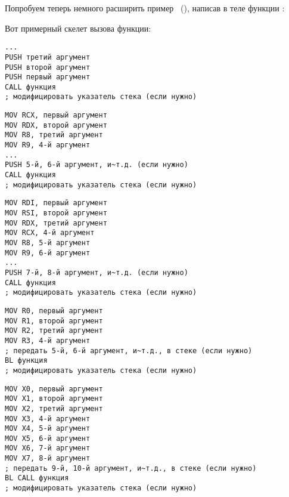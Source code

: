 \chapterold{\PrintfSeveralArgumentsSectionName}

Попробуем теперь немного расширить пример \IT{\HelloWorldSectionName}~(),
написав в теле функции \main:







\sectionold{\Conclusion{}}

Вот примерный скелет вызова функции:

\begin{lstlisting}[caption=x86]
...
PUSH третий аргумент
PUSH второй аргумент
PUSH первый аргумент
CALL функция
; модифицировать указатель стека (если нужно)
\end{lstlisting}

\begin{lstlisting}[caption=x64 (MSVC)]
MOV RCX, первый аргумент
MOV RDX, второй аргумент
MOV R8, третий аргумент
MOV R9, 4-й аргумент
...
PUSH 5-й, 6-й аргумент, и~т.д. (если нужно)
CALL функция
; модифицировать указатель стека (если нужно)
\end{lstlisting}

\begin{lstlisting}[caption=x64 (GCC)]
MOV RDI, первый аргумент
MOV RSI, второй аргумент
MOV RDX, третий аргумент
MOV RCX, 4-й аргумент
MOV R8, 5-й аргумент
MOV R9, 6-й аргумент
...
PUSH 7-й, 8-й аргумент, и~т.д. (если нужно)
CALL функция
; модифицировать указатель стека (если нужно)
\end{lstlisting}

\begin{lstlisting}[caption=ARM]
MOV R0, первый аргумент
MOV R1, второй аргумент
MOV R2, третий аргумент
MOV R3, 4-й аргумент
; передать 5-й, 6-й аргумент, и~т.д., в стеке (если нужно)
BL функция
; модифицировать указатель стека (если нужно)
\end{lstlisting}

\begin{lstlisting}[caption=ARM64]
MOV X0, первый аргумент
MOV X1, второй аргумент
MOV X2, третий аргумент
MOV X3, 4-й аргумент
MOV X4, 5-й аргумент
MOV X5, 6-й аргумент
MOV X6, 7-й аргумент
MOV X7, 8-й аргумент
; передать 9-й, 10-й аргумент, и~т.д., в стеке (если нужно)
BL CALL функция
; модифицировать указатель стека (если нужно)
\end{lstlisting}

